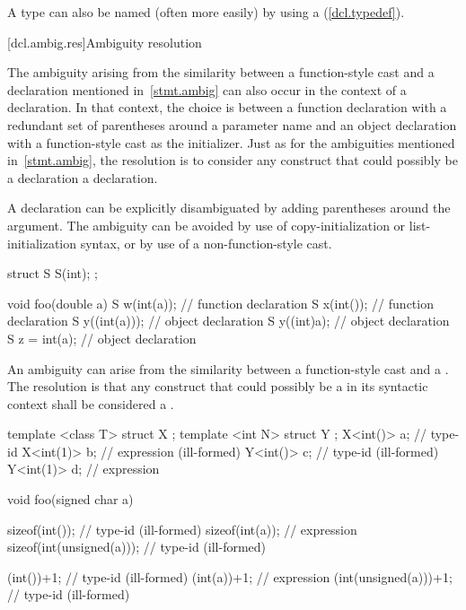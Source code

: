\pnum
A type can also be named (often more easily) by using a
(\ref{dcl.typedef}).

[dcl.ambig.res]{Ambiguity resolution}%
%

\pnum
The ambiguity arising from the similarity between a function-style cast and
a declaration mentioned in~\ref{stmt.ambig} can also occur in the context of a declaration.
In that context, the choice is between a function declaration with
a redundant set of parentheses around a parameter name and an object declaration
with a function-style cast as the initializer.
Just as for the ambiguities mentioned in~\ref{stmt.ambig},
the resolution is to consider any construct that could possibly
be a declaration a declaration.
\begin{note}
A declaration can be explicitly disambiguated by adding parentheses
around the argument.
The ambiguity can be avoided by use of copy-initialization or
list-initialization syntax, or by use of a non-function-style cast.
\end{note}
\begin{example}

\begin{codeblock}
struct S {
  S(int);
};

void foo(double a) {
  S w(int(a));      // function declaration
  S x(int());       // function declaration
  S y((int(a)));    // object declaration
  S y((int)a);      // object declaration
  S z = int(a);     // object declaration
}
\end{codeblock}
\end{example}

\pnum
An ambiguity can arise from the similarity between a function-style
cast and a
.
The resolution is that any construct that could possibly be a
in its syntactic context shall be considered a
.
\begin{example}

\begin{codeblock}
template <class T> struct X {};
template <int N> struct Y {};
X<int()> a;                     // type-id
X<int(1)> b;                    // expression (ill-formed)
Y<int()> c;                     // type-id (ill-formed)
Y<int(1)> d;                    // expression

void foo(signed char a) {
  sizeof(int());                // type-id (ill-formed)
  sizeof(int(a));               // expression
  sizeof(int(unsigned(a)));     // type-id (ill-formed)

  (int())+1;                    // type-id (ill-formed)
  (int(a))+1;                   // expression
  (int(unsigned(a)))+1;         // type-id (ill-formed)
}
\end{codeblock}
\end{example}

